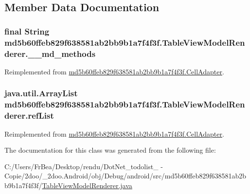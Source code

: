 \subsection{Member Data Documentation}
\hypertarget{classmd5b60ffeb829f638581ab2bb9b1a7f4f3f_1_1_table_view_model_renderer_21b72c97f46fee0f30a471fc36c20e2c}{
\subsubsection[{\_\-\_\-md\_\-methods}]{\setlength{\rightskip}{0pt plus 5cm}final String {\bf md5b60ffeb829f638581ab2bb9b1a7f4f3f.TableViewModelRenderer.\_\-\_\-md\_\-methods}}}
\label{classmd5b60ffeb829f638581ab2bb9b1a7f4f3f_1_1_table_view_model_renderer_21b72c97f46fee0f30a471fc36c20e2c}




Reimplemented from \hyperlink{classmd5b60ffeb829f638581ab2bb9b1a7f4f3f_1_1_cell_adapter_be33e45a7b887b1383f9c0ebda43ef00}{md5b60ffeb829f638581ab2bb9b1a7f4f3f.CellAdapter}.\hypertarget{classmd5b60ffeb829f638581ab2bb9b1a7f4f3f_1_1_table_view_model_renderer_367cc615fe3d215e4dd9e298f20d871a}{
\subsubsection[{refList}]{\setlength{\rightskip}{0pt plus 5cm}java.util.ArrayList {\bf md5b60ffeb829f638581ab2bb9b1a7f4f3f.TableViewModelRenderer.refList}}}
\label{classmd5b60ffeb829f638581ab2bb9b1a7f4f3f_1_1_table_view_model_renderer_367cc615fe3d215e4dd9e298f20d871a}




Reimplemented from \hyperlink{classmd5b60ffeb829f638581ab2bb9b1a7f4f3f_1_1_cell_adapter_954a374de657ac52ab7febec23bbae94}{md5b60ffeb829f638581ab2bb9b1a7f4f3f.CellAdapter}.

The documentation for this class was generated from the following file:\begin{CompactItemize}
\item 
C:/Users/FrBea/Desktop/rendu/DotNet\_\-todolist\_ - Copie/2doo/\_\-2doo.Android/obj/Debug/android/src/md5b60ffeb829f638581ab2bb9b1a7f4f3f/\hyperlink{_table_view_model_renderer_8java}{TableViewModelRenderer.java}\end{CompactItemize}
